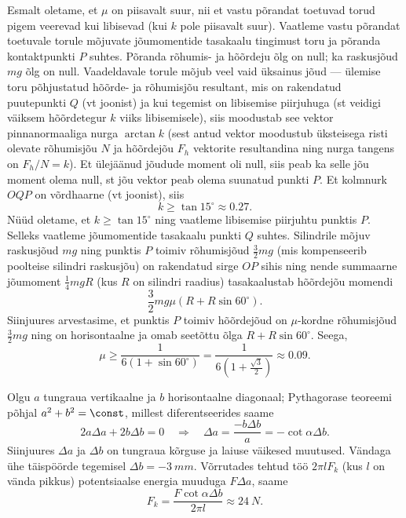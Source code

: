 \documentclass[10pt]{article}
\begin{document}
{Esmalt oletame, et $\mu$ on piisavalt suur, nii et vastu põrandat toetuvad torud pigem veerevad kui libisevad (kui $k$ pole piisavalt suur). Vaatleme vastu põrandat toetuvale torule mõjuvate jõumomentide tasakaalu tingimust toru ja põranda kontaktpunkti $P$ suhtes. Põranda rõhumis- ja hõõrdeju õlg on null; ka raskusjõud $mg$ õlg on null. Vaadeldavale torule mõjub veel vaid üksainus jõud --- ülemise toru põhjustatud hõõrde- ja rõhumisjõu resultant, mis on rakendatud puutepunkti $Q$ (vt joonist) ja kui tegemist on libisemise piirjuhuga (st veidigi väiksem hõõrdetegur $k$ viiks libisemisele), siis moodustab see vektor pinnanormaaliga nurga $\arctan k$ (sest antud vektor moodustub üksteisega risti olevate rõhumisjõu $N$ ja hõõrdejõu $F_h$ vektorite resultandina ning nurga tangens on $F_h/N=k$). Et ülejäänud jõudude moment oli null, siis peab ka selle jõu moment olema null,
st jõu vektor peab olema suunatud punkti $P$. Et kolmnurk $OQP$ on võrdhaarne (vt joonist),
siis
\[
k\ge \tan 15^\circ\approx \num{0,27}.
\]
Nüüd oletame, et $k \ge \tan 15^\circ$ ning vaatleme libisemise piirjuhtu punktis $P$. Selleks vaatleme jõumomentide tasakaalu punkti $Q$ suhtes.
Silindrile mõjuv raskusjõud $mg$ ning punktis $P$ toimiv rõhumisjõud $\frac 32 mg$ (mis kompenseerib poolteise silindri raskusjõu) on rakendatud sirge $OP$ sihis ning nende summaarne jõumoment $\frac 14mgR$ (kus $R$ on silindri raadius) tasakaalustab hõõrdejõu momendi 
\[
\frac 32 mg\mu \left(R+R\sin 60^\circ\right).
\]
Siinjuures arvestasime, et punktis $P$ toimiv hõõrdejõud on $\mu$-kordne rõhumisjõud $\frac 32 mg$ ning on horisontaalne ja omab seetõttu õlga $R+R\sin 60^\circ$. Seega,
\[
\mu \ge \frac{1}{6\left(1+\sin 60^\circ\right)}=\frac{1}{6\left(1+\frac{\sqrt 3}{2}\right)}\approx \num{0,09}.
\]
\probend
\bigskip


\solu
\osa Olgu $a$ tungraua vertikaalne ja $b$ horisontaalne diagonaal; Pythagorase teoreemi
põhjal $a^2 + b^2 = \const$, millest diferentseerides saame
\[
2 a \Delta a+2 b \Delta b=0 \quad \Rightarrow \quad \Delta a=\frac{-b \Delta b}{a}=-\cot \alpha \Delta b.
\]
Siinjuures $\Delta a$ ja $\Delta b$ on tungraua kõrguse ja laiuse väikesed muutused. Vändaga ühe
täispöörde tegemisel $\Delta b = \SI{-3}{mm}$. Võrrutades tehtud töö $2\pi lF_k$ (kus $l$ on vända
pikkus) potentsiaalse energia muuduga $F\Delta a$, saame
\[
F_{k} =\frac{F \cot \alpha \Delta b}{2 \pi l} \approx \SI{24}{N}.
\]

}
\end{document}
